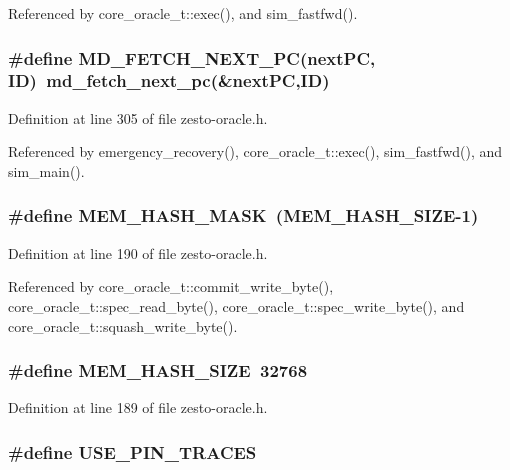 Referenced by core\_\-oracle\_\-t::exec(), and sim\_\-fastfwd().
\subsubsection[{MD\_\-FETCH\_\-NEXT\_\-PC}]{\setlength{\rightskip}{0pt plus 5cm}\#define MD\_\-FETCH\_\-NEXT\_\-PC(nextPC, \/  ID)~md\_\-fetch\_\-next\_\-pc(\&nextPC,ID)}\label{zesto-oracle_8h_486f7c7db21691d4d34a7818717e98b8}




Definition at line 305 of file zesto-oracle.h.

Referenced by emergency\_\-recovery(), core\_\-oracle\_\-t::exec(), sim\_\-fastfwd(), and sim\_\-main().
\subsubsection[{MEM\_\-HASH\_\-MASK}]{\setlength{\rightskip}{0pt plus 5cm}\#define MEM\_\-HASH\_\-MASK~(MEM\_\-HASH\_\-SIZE-1)}\label{zesto-oracle_8h_d2111e2165e4a519d36c3f3af50d557e}




Definition at line 190 of file zesto-oracle.h.

Referenced by core\_\-oracle\_\-t::commit\_\-write\_\-byte(), core\_\-oracle\_\-t::spec\_\-read\_\-byte(), core\_\-oracle\_\-t::spec\_\-write\_\-byte(), and core\_\-oracle\_\-t::squash\_\-write\_\-byte().
\subsubsection[{MEM\_\-HASH\_\-SIZE}]{\setlength{\rightskip}{0pt plus 5cm}\#define MEM\_\-HASH\_\-SIZE~32768}\label{zesto-oracle_8h_9f1b1e541085cdd8c4585b1d583e87ed}




Definition at line 189 of file zesto-oracle.h.
\subsubsection[{USE\_\-PIN\_\-TRACES}]{\setlength{\rightskip}{0pt plus 5cm}\#define USE\_\-PIN\_\-TRACES}\label{zesto-oracle_8h_3ad9043475baaed1a4a792d3b563c60d}




